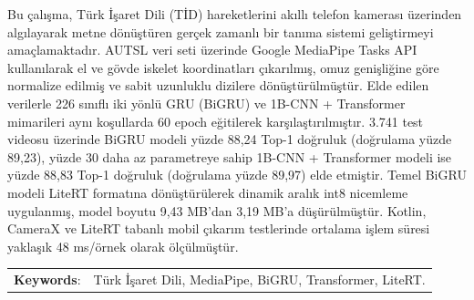 Bu çalışma, Türk İşaret Dili (TİD) hareketlerini akıllı telefon kamerası üzerinden algılayarak metne dönüştüren gerçek zamanlı bir tanıma sistemi geliştirmeyi amaçlamaktadır. AUTSL veri seti üzerinde Google MediaPipe Tasks API kullanılarak el ve gövde iskelet koordinatları çıkarılmış, omuz genişliğine göre normalize edilmiş ve sabit uzunluklu dizilere dönüştürülmüştür. Elde edilen verilerle 226 sınıflı iki yönlü GRU (BiGRU) ve 1B-CNN + Transformer mimarileri aynı koşullarda 60 epoch eğitilerek karşılaştırılmıştır. 3.741 test videosu üzerinde BiGRU modeli yüzde 88,24 Top-1 doğruluk (doğrulama yüzde 89,23), yüzde 30 daha az parametreye sahip 1B-CNN + Transformer modeli ise yüzde 88,83 Top-1 doğruluk (doğrulama yüzde 89,97) elde etmiştir. Temel BiGRU modeli LiteRT formatına dönüştürülerek dinamik aralık int8 nicemleme uygulanmış, model boyutu 9,43 MB'dan 3,19 MB'a düşürülmüştür. Kotlin, CameraX ve LiteRT tabanlı mobil çıkarım testlerinde ortalama işlem süresi yaklaşık 48 ms/örnek olarak ölçülmüştür.

\vspace{3mm}

 \begin{tabular}{ll}
 	{\textbf{Keywords}:} & { Türk İşaret Dili, MediaPipe, BiGRU, Transformer, LiteRT.}  \\	   
 \end{tabular} 
 




